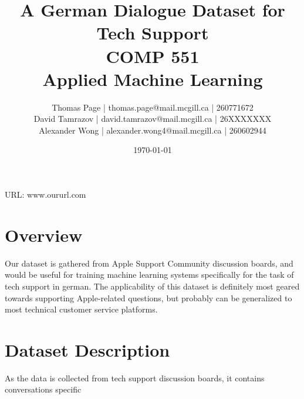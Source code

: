 \documentclass[12pt]{article}
\title{A German Dialogue Dataset for Tech Support\\ COMP 551 \\ Applied Machine Learning} %
\author{
Thomas Page | thomas.page@mail.mcgill.ca | 260771672 \\
David Tamrazov | david.tamrazov@mail.mcgill.ca | 26XXXXXXX \\
Alexander Wong | alexander.wong4@mail.mcgill.ca | 260602944} %
\date{\today} %
\begin{document}
\maketitle %


%

\begin{center}
URL: www.oururl.com
\end{center}


\section{Overview}
Our dataset is gathered from Apple Support Community discussion boards, and would be useful for training machine learning systems specifically for the task of tech support in german. The applicability of this dataset is definitely most geared towards supporting Apple-related questions, but probably can be generalized to most technical customer service platforms.


\section{Dataset Description}
As the data is collected from tech support discussion boards, it contains conversations specific 



\end{document}
